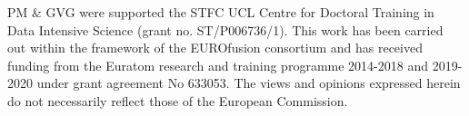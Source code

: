 {\footnotesize
PM \& GVG were supported the STFC UCL Centre for Doctoral Training in Data Intensive
Science (grant no. ST/P006736/1).
This work has been carried out within the framework of the EUROfusion consortium and has received funding from the Euratom research and training programme 2014-2018 and 2019-2020 under grant agreement No 633053. The views and opinions expressed herein do not necessarily reflect those of the European Commission.
}
